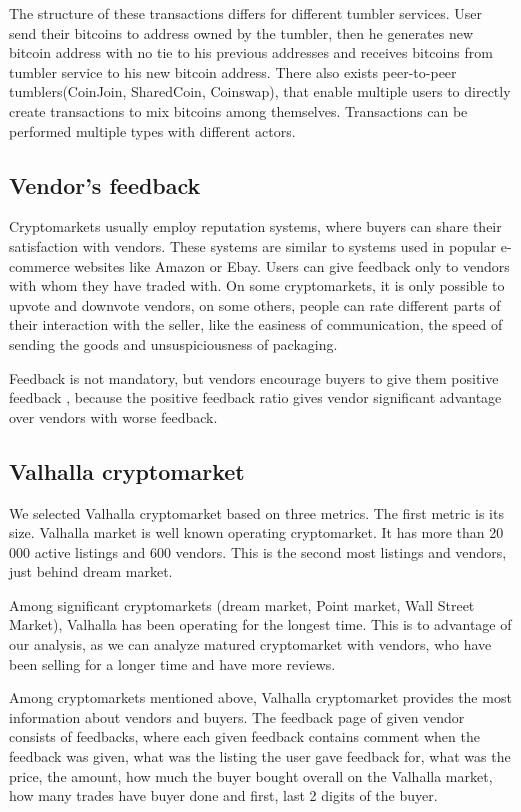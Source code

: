 \documentclass[
  digital, %
  table,   %
  lof,     %
  lot,     %
  oneside
]{fithesis3}
\begin{document}
The structure of these transactions differs for different tumbler services.
User send their bitcoins to address owned by the tumbler,
then he generates new bitcoin address with no tie to his previous addresses
and receives bitcoins from tumbler service to his new bitcoin address.
 There also exists peer-to-peer tumblers(CoinJoin, SharedCoin, Coinswap),
that enable multiple users to directly create transactions to mix bitcoins among themselves.
Transactions can be performed multiple types with different actors.

\subsection{Vendor's feedback}

Cryptomarkets usually employ reputation systems,
where buyers can share their satisfaction with vendors.
These systems are similar to systems used in popular e-commerce websites like Amazon or Ebay.
Users can give feedback only to vendors with whom they have traded with.
On some cryptomarkets, it is only possible to upvote and downvote vendors,
on some others, people can rate different parts of their interaction with the seller,
like the easiness of communication,
the speed of sending the goods and unsuspiciousness of packaging.

Feedback is not mandatory, but vendors encourage buyers to give them positive feedback
\parencite{aldridge2014not}\parencite{soska2015measuring}, because the positive feedback
ratio gives vendor significant advantage over vendors with worse feedback.

\subsection{Valhalla cryptomarket}

We selected Valhalla cryptomarket based on three metrics.
The first metric is its size. Valhalla market is well known operating cryptomarket.
It has more than 20 000 active listings and 600 vendors.
This is the second most listings and vendors, just behind dream market.

Among significant cryptomarkets (dream market, Point market, Wall Street Market), Valhalla
has been operating for the longest time. This is to advantage of our analysis, as we can analyze matured cryptomarket with vendors, who have been selling for a longer time and have more reviews.

Among cryptomarkets mentioned above,
Valhalla cryptomarket provides the most information about vendors and buyers.
The feedback page of given vendor consists of feedbacks, where
each given feedback contains comment when the feedback was given,
what was the listing the user gave feedback for, what was the price,
the amount, how much the buyer bought overall on the Valhalla market,
how many trades have buyer done and first, last 2 digits of the buyer.
\end{document}
